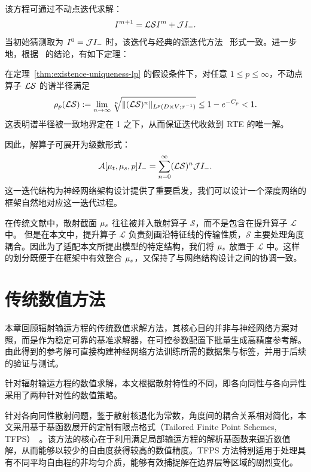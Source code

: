 该方程可通过不动点迭代求解：
\begin{equation}\label{eq:fixed-point-iteration}
    I^{m+1} = \mathcal{L}\mathcal{S} I^m + \mathcal{J} I_{-}.
\end{equation}
当初始猜测取为 $I^0 = \mathcal{J} I_{-}$ 时，该迭代与经典的源迭代方法
~\cite{adams2002fast}形式一致。进一步地，根据~\cite{egger2014lp} 的结论，有如下定理：
\begin{theorem}[谱半径估计]\label{thm:spectral-radius}
    在定理~\ref{thm:existence-uniqueness-lp} 的假设条件下，对任意 $1\leq p\leq \infty$，不动点算子 $\mathcal{L}\mathcal{S}$ 的谱半径满足
    \begin{equation}
        \rho_p(\mathcal{L}\mathcal{S}) := \lim_{n\to\infty}\sqrt[n]{\| (\mathcal{L}\mathcal{S})^n \|_{L^p(D\times V;\tau^{-1})}} \leq 1 - e^{-C_p} < 1.
    \end{equation}
    这表明谱半径被一致地界定在 1 之下，从而保证迭代收敛到 RTE 的唯一解。
\end{theorem}因此，解算子可展开为级数形式：
\begin{equation}\label{eq:soln-op-series}
    \mathcal{A}[\mu_t,\mu_s,p] I_{-} = \sum_{n=0}^\infty(\mathcal{L}\mathcal{S})^n\mathcal{J} I_{-}.
\end{equation}
这一迭代结构为神经网络架构设计提供了重要启发，我们可以设计一个深度网络的框架自然地对应这一迭代过程。

在传统文献中，散射截面 $\mu_s$ 往往被并入散射算子 $\mathcal{S}$，而不是包含在提升算子 $\mathcal{L}$ 中。
但是在本文中，提升算子 $\mathcal{L}$ 负责刻画沿特征线的传输性质，$\mathcal{S}$ 主要处理角度耦合。因此为了适配本文所提出模型的特定结构，我们将 $\mu_s$ 放置于 $\mathcal{L}$ 中。这样的划分既便于在框架中有效整合 $\mu_s$，又保持了与网络结构设计之间的协调一致。

\section{传统数值方法}

本章回顾辐射输运方程的传统数值求解方法，其核心目的并非与神经网络方案对照，而是作为稳定可靠的基准求解器，在可控参数配置下批量生成高精度参考解。由此得到的参考解可直接构建神经网络方法训练所需的数据集与标签，并用于后续的验证与测试。

针对辐射输运方程的数值求解，本文根据散射特性的不同，即各向同性与各向异性采用了两种针对性的数值策略。

针对各向同性散射问题，鉴于散射核退化为常数，角度间的耦合关系相对简化，本文采用基于基函数展开的定制有限点格式（Tailored Finite Point Schemes, TFPS）~\cite{han2014two}。该方法的核心在于利用满足局部输运方程的解析基函数来逼近数值解，从而能够以较少的自由度获得较高的数值精度。TFPS 方法特别适用于处理具有不同平均自由程的非均匀介质，能够有效捕捉解在边界层等区域的剧烈变化。

